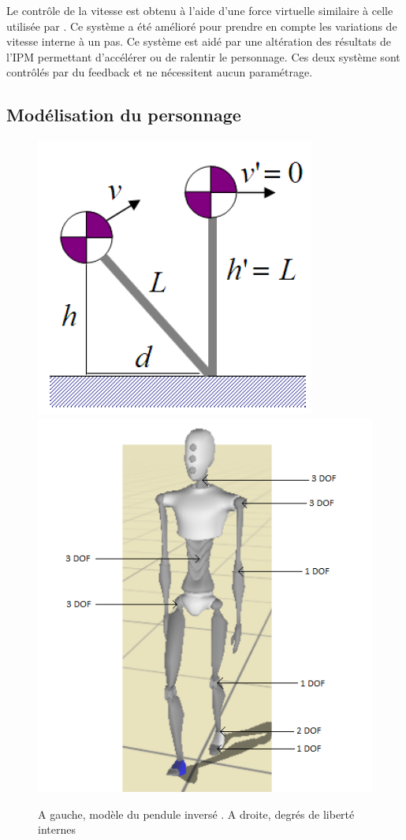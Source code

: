 \documentclass{llncs}
\begin{document}
Le contrôle de la vitesse est obtenu à l'aide d'une force virtuelle similaire à celle utilisée par \cite{coros2010generalized}. Ce système a été amélioré pour prendre en compte les variations de vitesse interne à un pas. Ce système est aidé par une altération des résultats de l'IPM permettant d'accélérer ou de ralentir le personnage. Ces deux système sont contrôlés par du feedback et ne nécessitent aucun paramétrage.
%
\subsection{Modélisation du personnage}
%
\begin{figure}[h]
\centering
\includegraphics[scale=0.5]{IPM.png}
\includegraphics[scale=0.5]{img_dof.png}
\caption{A gauche, modèle du pendule inversé \cite{coros2010generalized}. A droite, degrés de liberté internes}
\label{fig:dof}
\end{figure}
\end{document}
